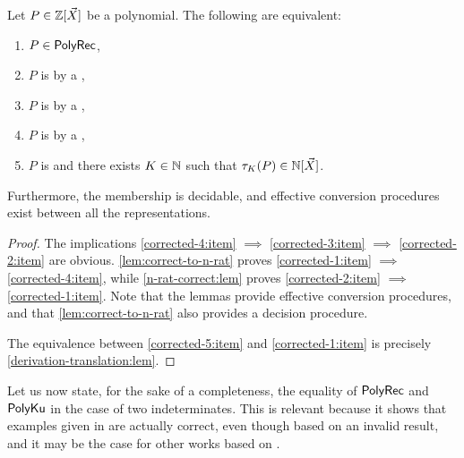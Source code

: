 \begin{theorem}
    \label{corrected-version:thm}
    Let $P \in \mathbb{Z}[\vec{X}]$ be a polynomial.
    The following are equivalent:
    \begin{enumerate}
        \item \label{corrected-1:item} $P \in \mathsf{PolyRec}$,
        \item \label{corrected-2:item} $P$ is  by a ,
        \item \label{corrected-3:item} $P$ is  by a ,
        \item \label{corrected-4:item} $P$ is  by a ,
        \item \label{corrected-5:item} $P$ is 
            and there exists $K \in \mathbb{N}$ such that $\tau_{K}(P) \in \mathbb{N}[\vec{X}]$.
    \end{enumerate}
    Furthermore, the membership is decidable, and effective conversion
    procedures exist between all the representations.
\end{theorem}
\begin{proof}
    The implications 
    \cref{corrected-4:item} $\implies$
    \cref{corrected-3:item} $\implies$
    \cref{corrected-2:item} are obvious.
    \cref{lem:correct-to-n-rat} proves
    \cref{corrected-1:item} $\implies$ \cref{corrected-4:item},
    while \cref{n-rat-correct:lem}
    proves 
    \cref{corrected-2:item} $\implies$ \cref{corrected-1:item}.
    Note that the lemmas provide effective conversion procedures,
    and that \cref{lem:correct-to-n-rat} also provides a decision
    procedure.

    The equivalence between
    \cref{corrected-5:item} and \cref{corrected-1:item}
    is precisely \cref{derivation-translation:lem}.
\end{proof}

Let us now state, for the sake of a completeness, the equality of
$\mathsf{PolyRec}$ and $\mathsf{PolyKu}$ in the case of two indeterminates. This is
relevant because it shows that examples given in \cite{KARH77} are actually
correct, even though based on an invalid result, and it may be the case for
other works based on \cite{KARH77}.


